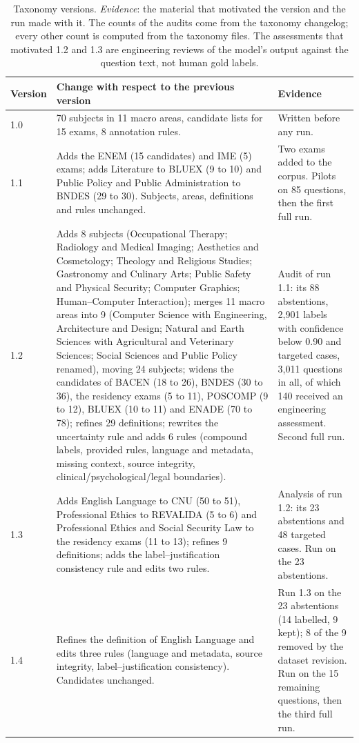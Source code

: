 \begin{table}[t]
\centering
\footnotesize
\setlength{\tabcolsep}{4pt}
\begin{tabular}{@{}lp{}p{}@{}}
\toprule
Version & Change with respect to the previous version & Evidence \\
\midrule
1.0 & 70 subjects in 11 macro areas, candidate lists for 15 exams, 8 annotation rules. & Written before any run. \\
1.1 & Adds the ENEM (15 candidates) and IME (5) exams; adds Literature to BLUEX (9 to 10) and Public Policy and Public Administration to BNDES (29 to 30). Subjects, areas, definitions and rules unchanged. & Two exams added to the corpus. Pilots on 85 questions, then the first full run. \\
1.2 & Adds 8 subjects (Occupational Therapy; Radiology and Medical Imaging; Aesthetics and Cosmetology; Theology and Religious Studies; Gastronomy and Culinary Arts; Public Safety and Physical Security; Computer Graphics; Human--Computer Interaction); merges 11 macro areas into 9 (Computer Science with Engineering, Architecture and Design; Natural and Earth Sciences with Agricultural and Veterinary Sciences; Social Sciences and Public Policy renamed), moving 24 subjects; widens the candidates of BACEN (18 to 26), BNDES (30 to 36), the residency exams (5 to 11), POSCOMP (9 to 12), BLUEX (10 to 11) and ENADE (70 to 78); refines 29 definitions; rewrites the uncertainty rule and adds 6 rules (compound labels, provided rules, language and metadata, missing context, source integrity, clinical/psychological/legal boundaries). & Audit of run 1.1: its 88 abstentions, 2,901 labels with confidence below 0.90 and targeted cases, 3,011 questions in all, of which 140 received an engineering assessment. Second full run. \\
1.3 & Adds English Language to CNU (50 to 51), Professional Ethics to REVALIDA (5 to 6) and Professional Ethics and Social Security Law to the residency exams (11 to 13); refines 9 definitions; adds the label--justification consistency rule and edits two rules. & Analysis of run 1.2: its 23 abstentions and 48 targeted cases. Run on the 23 abstentions. \\
1.4 & Refines the definition of English Language and edits three rules (language and metadata, source integrity, label--justification consistency). Candidates unchanged. & Run 1.3 on the 23 abstentions (14 labelled, 9 kept); 8 of the 9 removed by the dataset revision. Run on the 15 remaining questions, then the third full run. \\
\bottomrule
\end{tabular}
\caption{Taxonomy versions. \emph{Evidence}: the material that motivated the version and the run made with it. The counts of the audits come from the taxonomy changelog; every other count is computed from the taxonomy files. The assessments that motivated 1.2 and 1.3 are engineering reviews of the model's output against the question text, not human gold labels.}
\label{tab:ka-versions}
\end{table}

